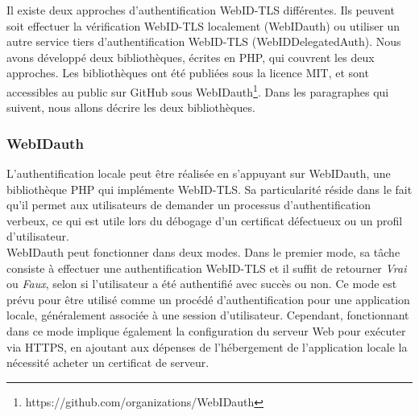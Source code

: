 \documentclass[a4paper]{article}
\begin{document}
Il existe deux approches d'authentification WebID-TLS différentes. Ils peuvent soit effectuer la vérification WebID-TLS localement ({WebIDauth}) ou utiliser un autre service tiers d'authentification WebID-TLS (WebIDDelegatedAuth). Nous avons développé deux bibliothèques, écrites en PHP, qui couvrent les deux approches. Les bibliothèques ont été publiées sous la licence MIT, et sont accessibles au public sur GitHub sous WebIDauth\footnote{https://github.com/organizations/WebIDauth}. Dans les paragraphes qui suivent, nous allons décrire les deux bibliothèques.

\subsubsection{WebIDauth}
L'authentification locale peut être réalisée en s'appuyant sur WebIDauth, une bibliothèque PHP qui implémente WebID-TLS. Sa particularité réside dans le fait qu'il permet aux utilisateurs de demander un processus d'authentification verbeux, ce qui est utile lors du débogage d'un certificat défectueux ou un profil d'utilisateur.\\


WebIDauth peut fonctionner dans deux modes. Dans le premier mode, sa tâche consiste à effectuer une authentification WebID-TLS et il suffit de retourner \textit{Vrai} ou \textit{Faux}, selon si l'utilisateur a été authentifié avec succès ou non. Ce mode est prévu pour être utilisé comme un procédé d'authentification pour une application locale, généralement associée à une session d'utilisateur. Cependant, fonctionnant dans ce mode implique également la configuration du serveur Web pour exécuter via HTTPS, en ajoutant aux dépenses de l'hébergement de l'application locale la nécessité acheter un certificat de serveur.\\
\end{document}
